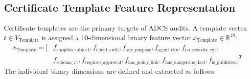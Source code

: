 \subsection{Certificate Template Feature Representation}
Certificate templates are the primary targets of ADCS audits. A template vertex $t \in V_{\text{Template}}$ is assigned a 10-dimensional binary feature vector $x_{\text{Template}} \in \mathbb{R}^{10}$:
\begin{equation}
\begin{aligned}
x_{\text{Template}} = [ & f_{\text{supplies\_subject}}, f_{\text{client\_auth}}, f_{\text{any\_purpose}}, f_{\text{agent\_eku}}, f_{\text{no\_security\_ext}}, \\
& f_{\text{schema\_v1}}, f_{\text{requires\_approval}}, f_{\text{has\_policy\_link}}, f_{\text{has\_dangerous\_dacl}}, f_{\text{is\_published}} ]^T
\end{aligned}
\end{equation}
The individual binary dimensions are defined and extracted as follows:
